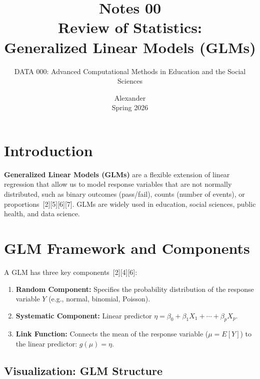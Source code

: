 \documentclass[11pt]{article}
\title{Notes 00 \\ Review of Statistics: \\ Generalized Linear Models (GLMs)}
\author{DATA 000: Advanced Computational Methods in Education and the Social Sciences}
\date{Alexander \\ Spring 2026}
\begin{document}
\maketitle

\tableofcontents

\section{Introduction}

\textbf{Generalized Linear Models (GLMs)} are a flexible extension of linear regression that allow us to model response variables that are not normally distributed, such as binary outcomes (pass/fail), counts (number of events), or proportions\ [2][5][6][7]. GLMs are widely used in education, social sciences, public health, and data science.

\section{GLM Framework and Components}

A GLM has three key components\ [2][4][6]:

\begin{enumerate}
    \item \textbf{Random Component:} Specifies the probability distribution of the response variable $Y$ (e.g., normal, binomial, Poisson).
    \item \textbf{Systematic Component:} Linear predictor $\eta = \beta_0 + \beta_1 X_1 + \cdots + \beta_p X_p$.
    \item \textbf{Link Function:} Connects the mean of the response variable ($\mu = E[Y]$) to the linear predictor: $g(\mu) = \eta$.
\end{enumerate}

\subsection*{Visualization: GLM Structure}
\begin{center}
\end{center}
\end{document}
